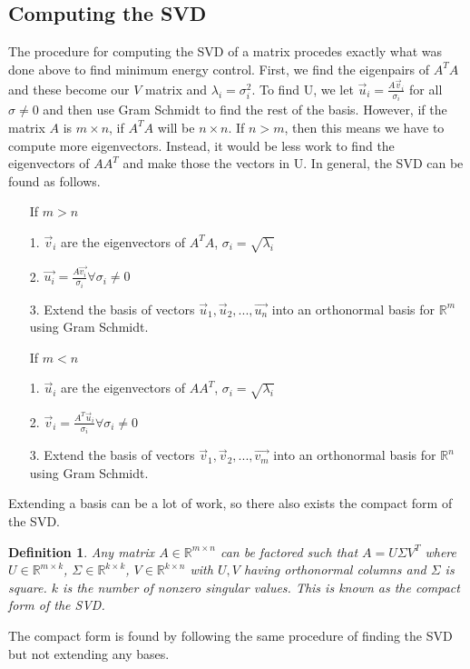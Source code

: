\documentclass{article}
\newtheorem{definition}{Definition}
\begin{document}
\subsection{Computing the SVD}
The procedure for computing the SVD of a matrix procedes exactly what was done above to find minimum energy control.
First, we find the eigenpairs of $A^TA$ and these become our $V$ matrix and $\lambda_i=\sigma_i^2$. To find U, we let $\vec{u}_i=\frac{A\vec{v}_i}{\sigma_i}$ for all $\sigma \ne 0$ and then use Gram Schmidt to find the rest of the basis.
However, if the matrix $A$ is $m \times n$, if $A^TA$ will be $n \times n$. If $n > m$, then this means we have to compute more eigenvectors. Instead, it would be less work to find the eigenvectors of $AA^T$ and make those the vectors in U.
In general, the SVD can be found as follows.
\begin{itemize}
    \item[] If $m > n$
    \item[1. ] $\vec{v}_i$ are the eigenvectors of $A^TA$, $\sigma_i=\sqrt{\lambda_i}$
    \item[2. ] $\vec{u_i}=\frac{A\vec{v_i}}{\sigma_i} \forall \sigma_i \ne 0$
    \item[3. ] Extend the basis of vectors ${\vec{u}_1, \vec{u}_2, ..., \vec{u_n}}$ into an orthonormal basis for $\mathbb{R}^m$ using Gram Schmidt.
    \item[] If $m < n$
    \item[1. ] $\vec{u}_i$ are the eigenvectors of $AA^T$, $\sigma_i=\sqrt{\lambda_i}$
    \item[2. ] $\vec{v}_i=\frac{A^T\vec{u}_i}{\sigma_i} \forall \sigma_i \ne 0$
    \item[3. ] Extend the basis of vectors ${\vec{v}_1, \vec{v}_2, ..., \vec{v_m}}$ into an orthonormal basis for $\mathbb{R}^n$ using Gram Schmidt.
\end{itemize}
Extending a basis can be a lot of work, so there also exists the compact form of the SVD.
\begin{definition}
    Any matrix $A\in \mathbb{R}^{m\times n}$ can be factored such that $A = U\Sigma V^T$
     where $U\in \mathbb{R}^{m\times k}$, $\Sigma \in \mathbb{R}^{k \times k}$, $V\in \mathbb{R}^{k \times n}$
     with $U,V$ having orthonormal columns and $\Sigma$ is square. $k$ is the number of nonzero singular values.
     This is known as the compact form of the SVD.
\end{definition}
The compact form is found by following the same procedure of finding the SVD but not extending any bases.
\end{document}
